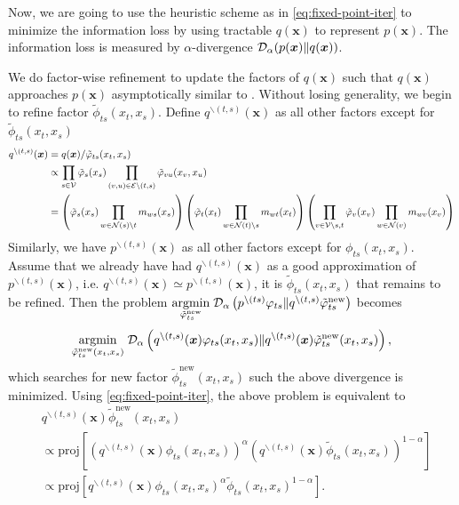 \documentclass[conference,onecolumn]{IEEEtran}
\begin{document}
Now, we are going to use the heuristic scheme as in \autoref{eq:fixed-point-iter} to minimize the information loss by using tractable $q(\bm{x})$ to represent $p(\bm{x})$. The information loss is measured by $\alpha$-divergence $\mathcal{D}_{\alpha}(p(\bm{x}) \| q(\bm{x}))$.

We do factor-wise refinement to update the factors of $q(\bm{x})$ such that $q(\bm{x})$ approaches $p(\bm{x})$ asymptotically similar to \cite{divergence-measures-and-message-passing,Minka:2001:EPA:647235.720257}. Without losing generality, we begin to refine factor $\tilde{\phi}_{ts}(x_t, x_s)$. Define $q^{\backslash (t,s)}(\bm{x})$ as all other factors except for $\tilde{\phi}_{ts}(x_t, x_s)$
\begin{align}
  q^{\backslash (t,s)}(\bm{x})
  &= q(\bm{x})/\tilde{\varphi}_{ts}(x_t,
    x_s) \nonumber \\
  &\propto \prod_{{s\in \mathcal{V}}} \tilde{\varphi}_s(x_s) \prod_{(v,u) \in
    \mathcal{E}\backslash (t,s)}
    \tilde{\varphi}_{vu}(x_v, x_u) \nonumber \\
  &= \left(
    \tilde{\varphi}_s(x_s) \prod_{w\in \mathcal{N}(s) \backslash t}m_{ws}(x_s)
    \right)
    \left(
    \tilde{\varphi}_t(x_t) \prod_{w\in \mathcal{N}(t) \backslash s}m_{wt}(x_t)
    \right)
    \left(
    \prod_{v \in \mathcal{V} \backslash s,t}
    \tilde{\varphi}_v(x_v) \prod_{w\in \mathcal{N}(v)}m_{wv}(x_v)
    \right)\nonumber \\
\end{align}
Similarly, we have $p^{\backslash (t,s)}(\bm{x})$ as all other factors except for ${\phi}_{ts}(x_t, x_s)$. Assume that we already have had $q^{\backslash (t,s)}(\bm{x})$ as a good approximation of $p^{\backslash (t,s)}(\bm{x})$, i.e. $q^{\backslash (t,s)}(\bm{x}) \simeq p^{\backslash (t,s)}(\bm{x})$, it is $\tilde{\phi}_{ts}(x_t, x_s)$ that remains to be refined. 
Then the problem $\underset{\tilde{\varphi}_{ts}^{\mathrm{new}}}{\operatorname{argmin}}\; \mathcal{D}_{\alpha}\left(  p^{\backslash (ts)}\varphi_{ts}\|q^{\backslash (t,s)}\tilde{\varphi}_{ts}^{\mathrm{new}}\right)$ becomes \vspace{-0.3cm}
\begin{equation}\label{eq:alpha-minimize-factor}
  \underset{\tilde{\varphi}_{ts}^{\mathrm{new}}(x_t, x_s)}{\operatorname{argmin}}\;
  \mathcal{D}_{\alpha}\left( q^{\backslash (t,s)}(\bm{x}){\varphi}_{ts}(x_t, x_s)
    \|q^{\backslash (t,s)}(\bm{x})\tilde{\varphi}_{ts}^{\mathrm{new}}(x_t, x_s) \right),
\end{equation}
which searches for new factor $\tilde{\phi}_{ts}^{\mathrm{new}}(x_t, x_s)$ such the above divergence is minimized.
Using \autoref{eq:fixed-point-iter}, the above problem is equivalent to
\begin{align}\label{eq:update-rule}
  &q^{\backslash (t,s)}(\bm{x})\tilde{\phi}_{ts}^{\mathrm{new}}(x_t, x_s)  \nonumber\\
  &\propto \text{proj}\left[ \left( q^{\backslash (t,s)}(\bm{x}){\phi}_{ts}(x_t, x_s) \right)^{\alpha} \left(q^{\backslash (t,s)}(\bm{x})\tilde{\phi}_{ts}(x_t, x_s)  \right)^{1-\alpha} \right] \nonumber \\
  & \propto \text{proj}\left[ q^{\backslash
    (t,s)}(\bm{x}){\phi}_{ts}(x_t, x_s)^{\alpha} \tilde{\phi}_{ts}(x_t, x_s)^{1-\alpha} \right].
\end{align}
\end{document}
